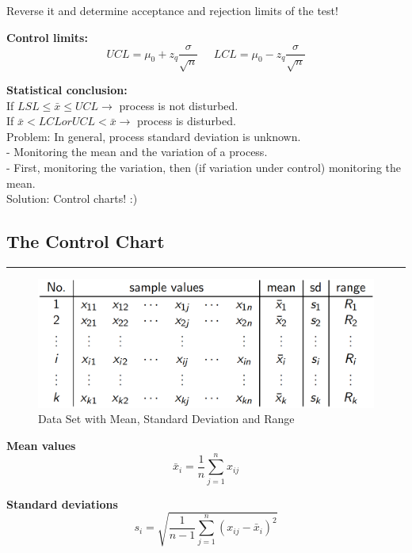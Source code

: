 Reverse it and determine acceptance and rejection limits of the test!

\textbf{Control limits:}
\begin{equation}
  UCL = \mu_0 + z_q \frac{\sigma}{\sqrt{n}} \;\;\;\;\; LCL = \mu_0 - z_q \frac{\sigma}{\sqrt{n}}
\end{equation}

\textbf{Statistical conclusion:}\\
If $LSL \leq \bar{x} \leq UCL \rightarrow$ process is not disturbed.\\
If $\bar{x} < LCL or UCL < \bar{x} \rightarrow$ process is disturbed.\\

Problem: In general, process standard deviation is unknown.\\
 - Monitoring the mean and the variation of a process.\\
 - First, monitoring the variation, then (if variation under control) monitoring the mean.\\

Solution: Control charts! :)


\subsection{The Control Chart}
\noindent\rule[\linienAbstand]{\linewidth}{\linienDicke}
\begin{figure}[H]
  \centering
  \includegraphics[width = 0.8\linewidth]{Pics/2.1.png}
  \caption{Data Set with Mean, Standard Deviation and Range}
  \label{2.1}
\end{figure}

\textbf{Mean values}
\begin{equation}
  \bar{x}_i = \frac{1}{n} \sum_{j=1}^n x_{ij}
\end{equation}

\textbf{Standard deviations}
\begin{equation}
  s_i = \sqrt{\frac{1}{n-1} \sum_{j=1}^n \left(x_{ij} - \bar{x}_i\right)^2}
\end{equation}

